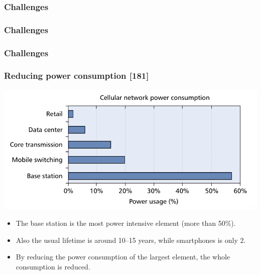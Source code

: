 \documentclass[a4paper,11pt,handout]{beamer}
\begin{document}
\begin{frame}
	\frametitle{Challenges}
\end{frame}
\begin{frame}
	\frametitle{Challenges}
\end{frame}
\begin{frame}
	\frametitle{Challenges}
\end{frame}
\begin{frame}
\frametitle{Reducing power consumption [181]}
	\begin{center}
	\includegraphics[scale=1]{consumption.png}
	\end{center}

\begin{itemize}

	\item The base station is the most power intensive element (more than 50\%).
	\item Also the usual lifetime is around 10--15 years, while smartphones is only 2.
	\item By reducing the power consumption of the largest element, the whole 
	consumption is reduced.

\end{itemize}
\end{frame}
\end{document}
